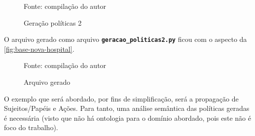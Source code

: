 \begin{figure}[!h]
	\centering
	\caption{Geração políticas 2}
	
	\label{fig:geracao-politicas2}
	{\scriptsize Fonte: compilação do autor}
\end{figure} 

O arquivo gerado como arquivo \texttt{\textbf{geracao\_politicas2.py}} ficou com o aspecto da \autoref{fig:base-nova-hospital}.
\begin{figure}[!h]
	\centering
	\caption{Arquivo gerado}
	
	\label{fig:base-nova-hospital}
	{\scriptsize Fonte: compilação do autor}
\end{figure} 

O exemplo que será abordado, por fins de simplificação, será a propagação de Sujeitos/Papéis e Ações. Para tanto, uma análise semântica das políticas geradas é necessária (visto que não há ontologia para o domínio abordado, pois este não é foco do trabalho). 

